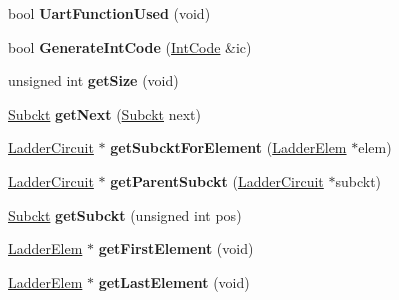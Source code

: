 \begin{DoxyCompactItemize}
\item 
\hypertarget{class_ladder_circuit_a42eeb7186c80bb5bdb76f3a356928b92}{bool {\bfseries Uart\-Function\-Used} (void)}\label{class_ladder_circuit_a42eeb7186c80bb5bdb76f3a356928b92}

\item 
\hypertarget{class_ladder_circuit_a517b76ad9fc6340c9bc189b1f84f016e}{bool {\bfseries Generate\-Int\-Code} (\hyperlink{class_int_code}{Int\-Code} \&ic)}\label{class_ladder_circuit_a517b76ad9fc6340c9bc189b1f84f016e}

\item 
\hypertarget{class_ladder_circuit_a8517d2327581a51eb0b5ce1ab90df0ff}{unsigned int {\bfseries get\-Size} (void)}\label{class_ladder_circuit_a8517d2327581a51eb0b5ce1ab90df0ff}

\item 
\hypertarget{class_ladder_circuit_a3b4b3aa4d5ecce70c6aa2bc3eae9268f}{\hyperlink{struct_subckt}{Subckt} {\bfseries get\-Next} (\hyperlink{struct_subckt}{Subckt} next)}\label{class_ladder_circuit_a3b4b3aa4d5ecce70c6aa2bc3eae9268f}

\item 
\hypertarget{class_ladder_circuit_aaf081a24dcba7fc641f4c1e085e4fe33}{\hyperlink{class_ladder_circuit}{Ladder\-Circuit} $\ast$ {\bfseries get\-Subckt\-For\-Element} (\hyperlink{class_ladder_elem}{Ladder\-Elem} $\ast$elem)}\label{class_ladder_circuit_aaf081a24dcba7fc641f4c1e085e4fe33}

\item 
\hypertarget{class_ladder_circuit_afeec19f4827ecf32e16b71f789f059cc}{\hyperlink{class_ladder_circuit}{Ladder\-Circuit} $\ast$ {\bfseries get\-Parent\-Subckt} (\hyperlink{class_ladder_circuit}{Ladder\-Circuit} $\ast$subckt)}\label{class_ladder_circuit_afeec19f4827ecf32e16b71f789f059cc}

\item 
\hypertarget{class_ladder_circuit_a3688d0ae1e57d25cd36245c481b24edd}{\hyperlink{struct_subckt}{Subckt} {\bfseries get\-Subckt} (unsigned int pos)}\label{class_ladder_circuit_a3688d0ae1e57d25cd36245c481b24edd}

\item 
\hypertarget{class_ladder_circuit_af10e56d2e4230337c7517eb9fb6e3287}{\hyperlink{class_ladder_elem}{Ladder\-Elem} $\ast$ {\bfseries get\-First\-Element} (void)}\label{class_ladder_circuit_af10e56d2e4230337c7517eb9fb6e3287}

\item 
\hypertarget{class_ladder_circuit_a97b709017e42e2650aab6ef296318eb4}{\hyperlink{class_ladder_elem}{Ladder\-Elem} $\ast$ {\bfseries get\-Last\-Element} (void)}\label{class_ladder_circuit_a97b709017e42e2650aab6ef296318eb4}


\end{DoxyCompactItemize}
